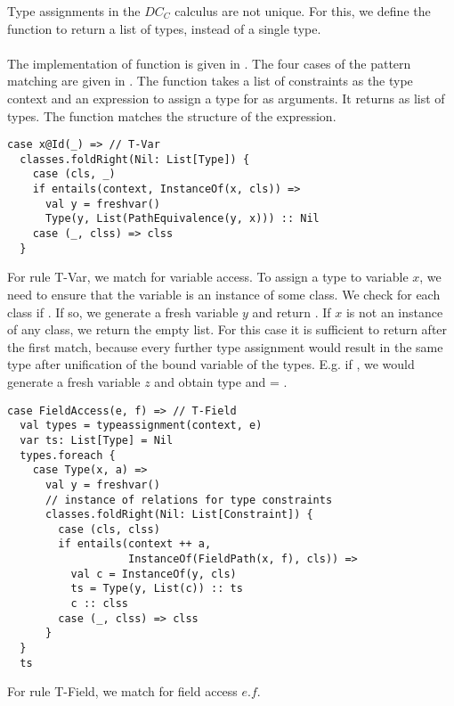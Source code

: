 Type assignments in the $DC_C$ calculus are not unique.
For this, we define the function 
to return a list of types, instead of a single type.\\
\\
The implementation of function 
is given in .
The four cases of the pattern matching are given in
.
The function takes a list of constraints as the type context
and an expression to assign a type for as arguments.
It returns as list of types.
The function matches the structure of the expression.
%
\begin{lstlisting}[caption={Case T-Var},label=lst:scala-typeass-var,captionpos=b,frame={lines}]
case x@Id(_) => // T-Var
  classes.foldRight(Nil: List[Type]) {
    case (cls, _)
    if entails(context, InstanceOf(x, cls)) =>
      val y = freshvar()
      Type(y, List(PathEquivalence(y, x))) :: Nil
    case (_, clss) => clss
  }
\end{lstlisting}
%
For rule T-Var, we match for variable access.
To assign a type to variable $x$, we need to ensure
that the variable is an instance of some class.
We check for each class  if .
If so, we generate a fresh variable $y$ and return .
If $x$ is not an instance of any class, we return the empty list.
For this case it is sufficient to return after the first match,
because every further type assignment
would result in the same type
after unification of the bound variable of the types.
E.g. if ,
we would generate a fresh variable $z$
and obtain type 
and  = .
%
\begin{lstlisting}[caption={Case T-Field},label=lst:scala-typeass-field,captionpos=b,frame={lines}]
case FieldAccess(e, f) => // T-Field
  val types = typeassignment(context, e)
  var ts: List[Type] = Nil
  types.foreach {
    case Type(x, a) =>
      val y = freshvar()
      // instance of relations for type constraints
      classes.foldRight(Nil: List[Constraint]) {
        case (cls, clss)
        if entails(context ++ a,
                   InstanceOf(FieldPath(x, f), cls)) =>
          val c = InstanceOf(y, cls)
          ts = Type(y, List(c)) :: ts
          c :: clss
        case (_, clss) => clss
      }
  }
  ts
\end{lstlisting}
%
For rule T-Field, we match for field access $e.f$.
